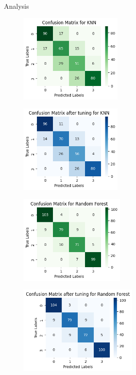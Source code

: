 \documentclass[14pt, aspectratio=169]{beamer}
\begin{document}
\begin{frame}[allowframebreaks]{Analysis}
\begin{adjustwidth}{-0.75cm}{1.25cm}
\begin{figure}[H]
    \centering
		\begin{minipage}{0.45\textwidth}
			\centering
			\includegraphics[height=12em]{../report/cmat_KNN.png}
			\label{cmat_KNN}
		\end{minipage}
    \hfill
    \begin{minipage}{0.45\textwidth}
        \centering
        \includegraphics[height=12em]{../report/cmat_tuned_KNN.png}
        \label{cmat_tuned_KNN}
    \end{minipage}
    
\end{figure}

\begin{figure}[H]
    \centering
		\begin{minipage}{0.45\textwidth}
			\centering
			\includegraphics[height=12em]{../report/cmat_RF.png}
			\label{cmat_RF}
		\end{minipage}
    \hfill
    \begin{minipage}{0.45\textwidth}
        \centering
        \includegraphics[height=12em]{../report/cmat_tuned_RF.png}
        \label{cmat_tuned_RF}
    \end{minipage}
\end{figure}


\end{adjustwidth}
\end{frame}
\end{document}
